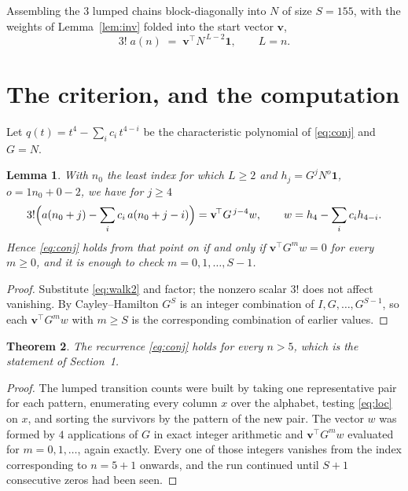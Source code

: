 \documentclass[11pt,a4paper]{article}
\theoremstyle{plain}
\newtheorem{theorem}{Theorem}
\newtheorem{lemma}[theorem]{Lemma}
\theoremstyle{definition}
\begin{document}
Assembling the $3$ lumped chains block-diagonally into $N$ of size $S=155$, with the
weights of Lemma~\ref{lem:inv} folded into the start vector $\mathbf{v}$,
\begin{equation}\label{eq:walk2}
3!\;a(n)\;=\;\mathbf{v}^{\!\top}N^{\,L-2}\mathbf{1},\qquad L=n .
\end{equation}

\section{The criterion, and the computation}

Let $q(t)=t^{4}-\sum_i c_i\,t^{4-i}$ be the characteristic polynomial of
\eqref{eq:conj} and $G=N$.

\begin{lemma}\label{lem:crit}
With $n_0$ the least index for which $L\ge2$ and $h_j=G^{j}N^{o}\mathbf{1}$,
$o=1n_0+0-2$, we have for $j\ge4$
\[
3!\Bigl(a(n_0+j)-\sum_i c_i\,a(n_0+j-i)\Bigr)
=\mathbf{v}^{\!\top}G^{\,j-4}w,\qquad
w=h_{4}-\sum_i c_i h_{4-i} .
\]
Hence \eqref{eq:conj} holds from that point on if and only if
$\mathbf{v}^{\!\top}G^{m}w=0$ for every $m\ge0$, and it is enough to check
$m=0,1,\dots,S-1$.
\end{lemma}

\begin{proof}
Substitute \eqref{eq:walk2} and factor; the nonzero scalar $3!$ does not affect
vanishing. By Cayley--Hamilton $G^{S}$ is an integer combination of $I,G,\dots,G^{S-1}$,
so each $\mathbf{v}^{\!\top}G^{m}w$ with $m\ge S$ is the corresponding combination of
earlier values.
\end{proof}

\begin{theorem}
The recurrence \eqref{eq:conj} holds for every $n>5$, which is the statement of
Section~1.
\end{theorem}

\begin{proof}
The lumped transition counts were built by taking one representative pair for each pattern,
enumerating every column $x$ over the alphabet, testing \eqref{eq:loc} on $x$, and sorting
the survivors by the pattern of the new pair. The vector $w$ was formed by $4$
applications of $G$ in exact integer arithmetic and $\mathbf{v}^{\!\top}G^{m}w$
evaluated for $m=0,1,\dots$, again exactly. Every one of those integers vanishes from the
index corresponding to $n=5+1$ onwards, and the run continued until $S+1$ consecutive
zeros had been seen.
\end{proof}
\end{document}
